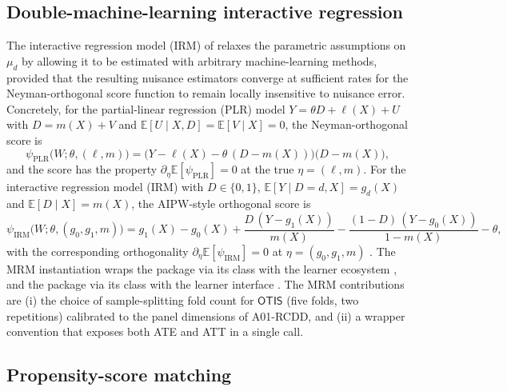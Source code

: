 \documentclass[article,shortnames,nojss]{jss}
\newcommand{\OTIS}{\textsf{OTIS}}
\begin{document}
\subsection{Double-machine-learning interactive regression}
\label{sec:irm-dml}

The interactive regression model (IRM) of
\citet{Chernozhukov2018DML} relaxes the parametric assumptions on
$\mu_d$ by allowing it to be estimated with arbitrary
machine-learning methods, provided that the resulting nuisance
estimators converge at sufficient rates for the Neyman-orthogonal
score function to remain locally insensitive to nuisance error.
Concretely, for the partial-linear regression (PLR) model
$Y = \theta D + \ell(X) + U$ with $D = m(X) + V$ and
$\mathbb{E}[U \mid X, D] = \mathbb{E}[V \mid X] = 0$, the
Neyman-orthogonal score is
\begin{equation}\label{eq:plr-score}
\psi_{\mathrm{PLR}}\bigl(W; \theta, (\ell, m)\bigr) =
\bigl(Y - \ell(X) - \theta\,(D - m(X))\bigr)
\bigl(D - m(X)\bigr),
\end{equation}
and the score has the property
$\partial_\eta \mathbb{E}[\psi_{\mathrm{PLR}}] = 0$ at the
true $\eta=(\ell,m)$.  For the interactive regression model
(IRM) with $D \in \{0,1\}$, $\mathbb{E}[Y \mid D=d, X] = g_d(X)$
and $\mathbb{E}[D \mid X] = m(X)$, the AIPW-style orthogonal
score is
\begin{equation}\label{eq:irm-score}
\psi_{\mathrm{IRM}}\bigl(W; \theta, (g_0, g_1, m)\bigr) =
g_1(X) - g_0(X)
+ \frac{D\,(Y - g_1(X))}{m(X)}
- \frac{(1-D)\,(Y - g_0(X))}{1 - m(X)}
- \theta,
\end{equation}
with the corresponding orthogonality
$\partial_\eta \mathbb{E}[\psi_{\mathrm{IRM}}] = 0$ at
$\eta=(g_0, g_1, m)$ \citep{Chernozhukov2018DML}.  The MRM
instantiation wraps the  package
 \citep{Bach2024DoubleML} via its 
class with the  learner ecosystem \citep{Lang2019mlr3},
and the  package  via its
 class with the  learner
interface \citep{Bach2022DoubleMLpy, Pedregosa2011}. The MRM
contributions are (i) the choice of sample-splitting fold count
for $\OTIS$ (five folds, two repetitions) calibrated to the panel
dimensions of A01-RCDD, and (ii) a wrapper convention that exposes
both ATE and ATT in a single call.

\subsection{Propensity-score matching}
\end{document}
